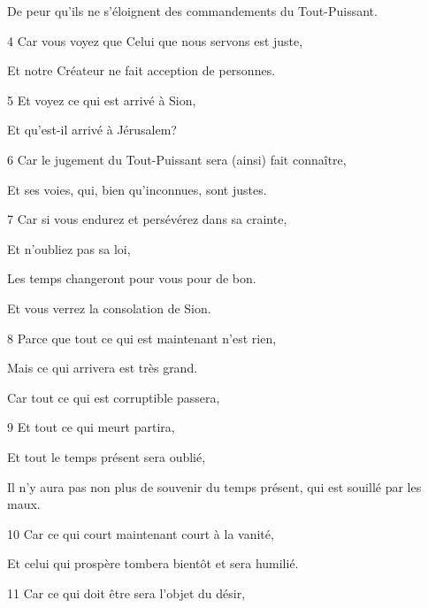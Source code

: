 \par De peur qu'ils ne s'éloignent des commandements du Tout-Puissant.

\par 4 Car vous voyez que Celui que nous servons est juste,

\par Et notre Créateur ne fait acception de personnes.

\par 5 Et voyez ce qui est arrivé à Sion,

\par Et qu'est-il arrivé à Jérusalem?

\par 6 Car le jugement du Tout-Puissant sera (ainsi) fait connaître,

\par Et ses voies, qui, bien qu'inconnues, sont justes.

\par 7 Car si vous endurez et persévérez dans sa crainte,

\par Et n'oubliez pas sa loi,

\par Les temps changeront pour vous pour de bon.

\par Et vous verrez la consolation de Sion.

\par 8 Parce que tout ce qui est maintenant n'est rien,

\par Mais ce qui arrivera est très grand.

\par Car tout ce qui est corruptible passera,

\par 9 Et tout ce qui meurt partira,

\par Et tout le temps présent sera oublié,

\par Il n'y aura pas non plus de souvenir du temps présent, qui est souillé par les maux.

\par 10 Car ce qui court maintenant court à la vanité,

\par Et celui qui prospère tombera bientôt et sera humilié.

\par 11 Car ce qui doit être sera l'objet du désir,

